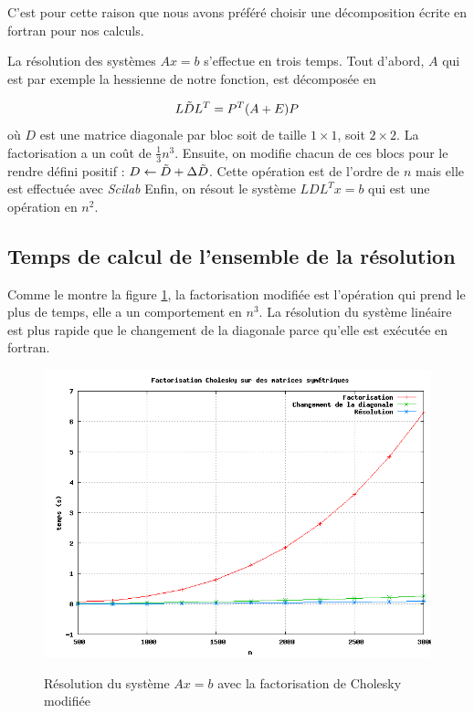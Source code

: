 C'est pour cette raison que nous avons pr\'ef\'er\'e choisir une d\'ecomposition \'ecrite en fortran pour nos calculs.


La r\'esolution des syst\`emes $Ax=b$ s'effectue en trois temps. Tout d'abord, $A$ qui est par exemple 
la hessienne de notre fonction, est d\'ecompos\'ee en

 $$L\Tilde{D}L^T=P^T(A+E)P$$ o\`u $D$ est une matrice diagonale par bloc soit de taille $1\times 1$, soit $2\times 2$.
 La factorisation a un coût de $\frac{1}{3}n^3$. Ensuite, on modifie chacun de ces blocs
pour le rendre d\'efini positif : $D\leftarrow \Tilde{D}+\Delta \Tilde{D}$. Cette op\'eration est 
de l'ordre de $n$ mais elle est effectu\'ee avec {\it Scilab}
 Enfin, on r\'esout le syst\`eme $LDL^Tx=b$ qui est une op\'eration en $n^2$.








\subsection{Temps de calcul de l'ensemble de la r\'esolution}


Comme le montre la figure \ref{fig:temps8}, la factorisation modifi\'ee est l'op\'eration qui prend le plus de temps,
elle a un comportement en $n^3$. La r\'esolution du syst\`eme lin\'eaire est plus rapide que le changement de la 
diagonale parce qu'elle est ex\'ecut\'ee en fortran.
\begin{figure}
\caption{R\'esolution du syst\`eme $Ax=b$ avec la factorisation de Cholesky modifi\'ee}
\center
\includegraphics[scale=0.4]{figures/temps8.png}
\label{fig:temps8}
\end{figure}


